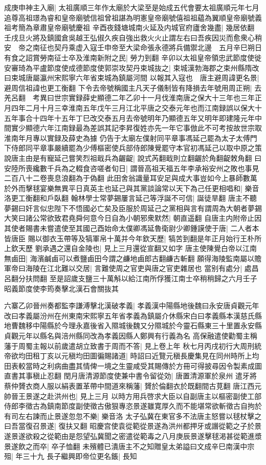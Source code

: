 成庚申神主入廟|{
	太祖廣順三年作太廟於大梁至是始成五代會要太祖廣順元年七月追尊高祖璟為睿和皇帝廟號信祖曾祖諶為明憲皇帝廟號僖祖祖藴為翼順皇帝廟號義祖考簡為章肅皇帝廟號慶祖}
辛酉夜錢塘城南火延及内城官府廬舍幾盡|{
	幾居依翻}
壬戌旦火將及鎮國倉吳越王弘俶久疾自強出救火火止謂左右曰吾疾因災而愈衆心稍安　帝之南征也契丹乘虚入寇壬申帝至大梁命張永德將兵備禦北邊　五月辛巳朔日有食之詔賞勞南征士卒及淮南新附之民|{
	勞力到翻}
辛卯以太祖皇帝領忠武節度使徙安審琦為平盧節度使成德節度使郭崇攻契丹束城抜之|{
	束城漢勃海郡之束州縣隋改曰束城唐屬瀛州宋熙寧六年省束城為鎮屬河間}
以報其入寇也　唐主避周諱更名景|{
	避周信祖諱也更工衡翻}
下令去帝號稱國主凡天子儀制皆有降損去年號用周正朔|{
	去羌呂翻　考異曰世宗實録薛史顯德二年乙卯十一月伐淮南唐之保大十三年也三年正月四年二月十月三幸淮南五年戊午三月江北平唐之交泰元年也而江南録誤以保大十五年事合十四年十五年丁巳改交泰五月去帝號明年乃顯德五年又明年即建隆元年中間實少顯德六年江南録最為差誤其記李昇復姓亦先一年它事倣此不可考按故世宗取淮南年月專以實録及薛史為據}
仍告于太廟左僕射同平章事馮延己罷為太子太傅門下侍郎同平章事嚴續罷為少傅樞密使兵部侍郎陳覺罷守本官初馮延己以取中原之策說唐主由是有寵延己嘗笑烈祖戢兵為齷齪|{
	說式芮翻戢則立翻齷於角翻齪敇角翻}
曰安陸所喪纔數千兵為之輟食咨嗟者旬日|{
	謂晉高祖天福五年李承裕安州之敗也事見二百八十二卷喪息浪翻為于偽翻}
此田舍翁識量耳安足與成大事豈如今上暴師數萬於外而擊毬宴樂無異平日真英主也延己與其黨談論常以天下為己任更相唱和|{
	樂音洛更工衡翻和戶臥翻}
翰林學士常夢錫屢言延己等浮誕不可信|{
	誕徒旱翻}
唐主不聽夢錫曰奸言似忠陛下不悟國必亡矣及臣服於周延己之黨相與言有謂周為大朝者夢錫大笑曰諸公常欲致君堯舜何意今日自為小朝邪衆默然|{
	朝直遥翻}
自唐主内附帝止因其使者賜書未嘗遣使至其國己酉始命太僕卿馮延魯衛尉少卿鍾謨使于唐|{
	二人者本皆唐臣}
賜以御衣玉帶等及犒軍帛十萬并今年欽天歷|{
	犒苦到翻是年正月始行王朴所上欽天歷}
劉承遇之還自金陵也|{
	見上三月還從宣翻又如字}
唐主使陳覺白帝以江南無鹵田|{
	海濱鹹鹵可以煮鹽鹵田今謂之鹻地鹵郎古翻鹻古斬翻}
願得海陵監南屬以贍軍帝曰海陵在江北難以交居|{
	言難使周之官吏與唐之官吏雜居也}
當别有處分|{
	處昌呂翻分扶問翻}
至是詔歲支鹽三十萬斛以給江南所俘獲江南士卒稍稍歸之六月壬子昭義節度使李筠奏擊北漢石會關抜其

六寨乙卯晉州奏都監李謙溥擊北漢破孝義|{
	孝義漢中陽縣地後魏曰永安唐貞觀元年改曰孝義屬汾州在州東南宋熙寧五年省孝義為鎮屬介休縣宋白曰孝義縣本漢慈氏縣地曹魏移中陽縣於今理永嘉後省入隰城後魏又分隰城於今靈石縣東三十里置永安縣貞觀元年以縣名與涪州縣同改為孝義因縣人鄭興有行義為名}
高保融遣使勸蜀主稱藩于周蜀主報以前歲遣胡立致書于周而不答|{
	見上卷上年}
秋七月丙戌初行大周刑統　帝欲均田租丁亥以元稹均田圖徧賜諸道|{
	時詔曰近覽元稹長慶集見在同州時所上均田表較當時之利病曲盡其情俾一境之生靈咸受其賜傳於方冊可得披尋因令製素成圖直書其事稹止忍翻}
閏月唐清源節度使兼中書令留從効|{
	唐置清源軍於泉州}
遣牙將蔡仲贇衣商人服以絹表置革帶中間道來稱藩|{
	贇於倫翻衣於既翻間古莧翻}
唐江西元帥晉王景遂之赴洪州也|{
	見上三月}
以時方用兵啓求大臣以自副唐主以樞密副使工部侍郎李徵古為鎮南節度副使徵古傲狠專恣景遂雖寛厚久而不能堪常欲斬徵古自拘於有司左右諫而止景遂忽忽不樂|{
	樂音洛}
太子弘冀在東官多不法唐主怒嘗以毬杖擊之曰吾當復召景遂|{
	復扶又翻}
昭慶宫使袁從範從景遂為洪州都押牙或譖從範之子於景遂景遂欲殺之從範由是怨望弘冀聞之密遣從範毒之八月庚辰景遂擊毬渇甚從範進漿景遂飲之而卒|{
	卒子恤翻}
未殯體已潰唐主不之知贈皇太弟謚曰文成辛巳南漢中宗殂|{
	年三十九}
長子繼興即帝位更名鋹|{
	長知}



